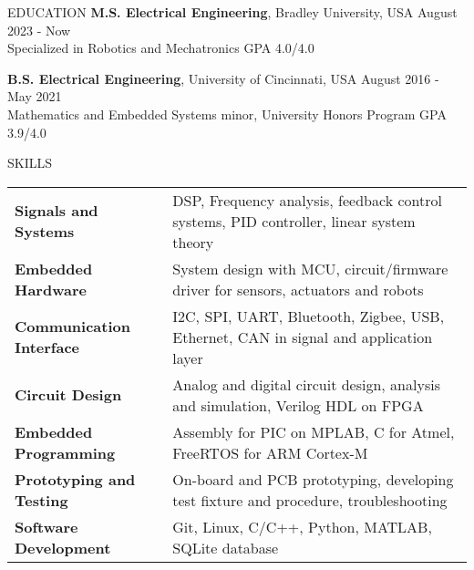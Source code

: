 \documentclass{lib/resume} %
\begin{document}

\begin{rSection}{EDUCATION}
    {\bf M.S. Electrical Engineering}, Bradley University, USA \hfill {August 2023 - Now} \\
    Specialized in Robotics and Mechatronics \hfill GPA 4.0/4.0 \smallskip

    {\bf B.S. Electrical Engineering}, University of Cincinnati, USA \hfill {August 2016 - May 2021}\\
    Mathematics and Embedded Systems minor, University Honors Program \hfill {GPA 3.9/4.0}



\end{rSection}

\begin{rSection}{SKILLS}

    \begin{tabular}{ @{} >{\bfseries}l @{\hspace{2ex}} l }
        Signals and Systems     & DSP, Frequency analysis, feedback control systems, PID controller, linear system theory       \\
        Embedded Hardware       & System design with MCU, circuit/firmware driver for sensors, actuators and robots \\
        Communication Interface & I2C, SPI, UART, Bluetooth, Zigbee, USB, Ethernet, CAN in signal and application layer \\
        Circuit Design          & Analog and digital circuit design, analysis and simulation, Verilog HDL on FPGA               \\
        Embedded Programming    & Assembly for PIC on MPLAB, C for Atmel, FreeRTOS for ARM Cortex-M                   \\
        Prototyping and Testing & On-board and PCB prototyping, developing test fixture and procedure, troubleshooting          \\
        Software Development    & Git, Linux, C/C++, Python, MATLAB, SQLite database                                             \\
    \end{tabular}
\end{rSection}
\end{document}
